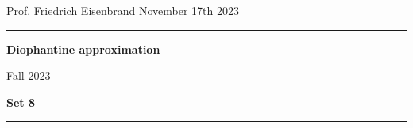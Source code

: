 \documentclass[12pt,a4paper]{article}
\date{}
\theoremstyle{plain}
\newtheorem*{Sol*}{Solution}
\theoremstyle{definition}
\newtheorem{Ex}{Exercise}
\newif\ifsolutions
\newcommand{\exercise}[2]{
			\begin{Ex} #1 \end{Ex}
			\ifsolutions  \begin{Sol*} #2 \end{Sol*} \bigskip \else \bigskip  \fi
		}
\begin{document}
\begin{center}
{Prof. Friedrich Eisenbrand \hfill November 17th 2023}
\end{center}
	
\hrule\vspace{\baselineskip}

\begin{center}
\textbf{Diophantine approximation}

Fall 2023

\bigskip

\textbf{Set 8}
\ifsolutions{\textbf{- Solutions}} \else{} \fi
\end{center}

\hrule\vspace{\baselineskip}



\end{document}
